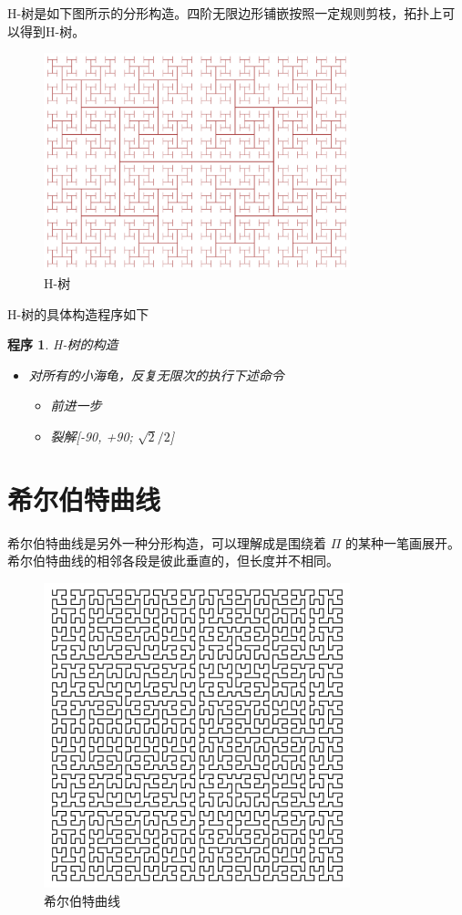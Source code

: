 \documentclass[a4paper,12pt]{article}
\newtheorem{program}{程序}
\begin{document}
H-树是如下图所示的分形构造。四阶无限边形铺嵌按照一定规则剪枝，拓扑上可以得到H-树。

\begin{figure}[ht]
\centering
\includegraphics[width=3.5in]{images/2000px-H_tree.png}
\caption{H-树}
\end{figure}

H-树的具体构造程序如下

\begin{program}
H-树的构造
\begin{itemize}
\item 对所有的小海龟，反复无限次的执行下述命令
\begin{itemize}\item 前进一步 \item 裂解[-90, +90; $\sqrt{2} / 2$] \end{itemize}
\end{itemize}
\end{program}

\newpage

\section{希尔伯特曲线}

希尔伯特曲线是另外一种分形构造，可以理解成是围绕着 $\Pi$ 的某种一笔画展开。希尔伯特曲线的相邻各段是彼此垂直的，但长度并不相同。

\begin{figure}[ht]
\centering
\includegraphics[width=3.5in]{images/hilbert.png}
\caption{希尔伯特曲线}
\end{figure}
\end{document}
